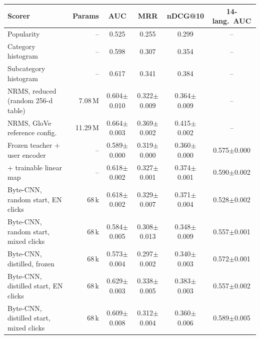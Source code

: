\begin{tabular}{lrcccc}
\toprule
Scorer & Params & AUC & MRR & nDCG@10 & 14-lang.\ AUC\\
\midrule
Popularity & -- & 0.525 & 0.255 & 0.299 & -- \\
Category histogram & -- & 0.598 & 0.307 & 0.354 & -- \\
Subcategory histogram & -- & 0.617 & 0.341 & 0.384 & -- \\
\midrule
NRMS, reduced (random 256-d table) & 7.08\,M & 0.604$\pm$0.010 & 0.322$\pm$0.009 & 0.364$\pm$0.009 & -- \\
NRMS, GloVe reference config. & 11.29\,M & 0.664$\pm$0.003 & 0.369$\pm$0.002 & 0.415$\pm$0.002 & -- \\
\midrule
Frozen teacher + user encoder & -- & 0.589$\pm$0.000 & 0.319$\pm$0.000 & 0.360$\pm$0.000 & 0.575$\pm$0.000 \\
\quad + trainable linear map & -- & 0.618$\pm$0.002 & 0.327$\pm$0.001 & 0.374$\pm$0.001 & 0.590$\pm$0.002 \\
\midrule
Byte-CNN, random start, EN clicks & 68\,k & 0.618$\pm$0.002 & 0.329$\pm$0.007 & 0.371$\pm$0.004 & 0.528$\pm$0.002 \\
Byte-CNN, random start, mixed clicks & 68\,k & 0.584$\pm$0.005 & 0.308$\pm$0.013 & 0.348$\pm$0.009 & 0.557$\pm$0.001 \\
Byte-CNN, distilled, frozen & 68\,k & 0.573$\pm$0.004 & 0.297$\pm$0.002 & 0.340$\pm$0.003 & 0.572$\pm$0.001 \\
Byte-CNN, distilled start, EN clicks & 68\,k & 0.629$\pm$0.003 & 0.338$\pm$0.005 & 0.383$\pm$0.003 & 0.557$\pm$0.002 \\
Byte-CNN, distilled start, mixed clicks & 68\,k & 0.609$\pm$0.008 & 0.312$\pm$0.004 & 0.360$\pm$0.006 & 0.589$\pm$0.005 \\
\bottomrule
\end{tabular}
